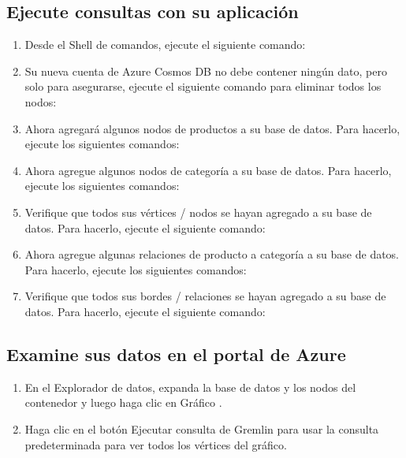 \documentclass[12pt,letterpaper]{article}
\begin{document}
\begin{enumerate}
\begin{enumerate}
\begin{enumerate}
		\end{enumerate}
	
	
\subsection{Ejecute consultas con su aplicación }
	
	
	\begin{enumerate}
		
		\item Desde el Shell de comandos, ejecute el siguiente comando:
		
		\item  Su nueva cuenta de Azure Cosmos DB no debe contener ningún dato, pero solo para asegurarse, ejecute el siguiente comando para eliminar todos los nodos:
		
		\item  Ahora agregará algunos nodos de productos a su base de datos. Para hacerlo, ejecute los siguientes comandos:
		
		\item  Ahora agregue algunos nodos de categoría a su base de datos. Para hacerlo, ejecute los siguientes comandos:
		
		\item  Verifique que todos sus vértices / nodos se hayan agregado a su base de datos. Para hacerlo, ejecute el siguiente comando:
		
		\item  Ahora agregue algunas relaciones de producto a categoría a su base de datos. Para hacerlo, ejecute los siguientes comandos:
		
		\item Verifique que todos sus bordes / relaciones se hayan agregado a su base de datos. Para hacerlo, ejecute el siguiente comando:
		
	\end{enumerate}


\subsection{Examine sus datos en el portal de Azure }


\begin{enumerate}
	
	\item En el Explorador de datos, expanda la base de datos y los nodos del contenedor y luego haga clic en Gráfico .
	
	\item Haga clic en el botón Ejecutar consulta de Gremlin para usar la consulta predeterminada para ver todos los vértices del gráfico.
	

\end{enumerate}
\end{enumerate}
\end{enumerate}
\end{document}
